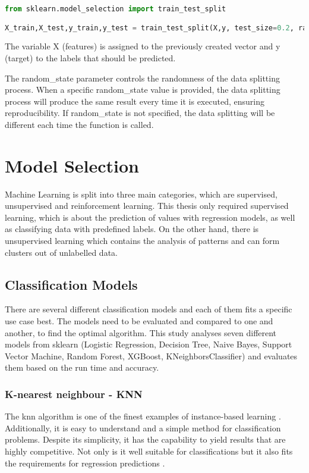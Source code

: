 \begin{lstlisting}[language=Python, caption=Train-Test-Split in Python, label=lst:train-test-split]
from sklearn.model_selection import train_test_split

X_train,X_test,y_train,y_test = train_test_split(X,y, test_size=0.2, random_state=42)
\end{lstlisting}

The variable X (features) is assigned to the previously created vector and y (target) to the labels that should be predicted. 

The random\_state parameter controls the randomness of the data splitting process. When a specific random\_state value is provided, the data splitting process will produce the same result every time it is executed, ensuring reproducibility. If random\_state is not specified, the data splitting will be different each time the function is called.

\section{Model Selection}

Machine Learning is split into three main categories, which are supervised, unsupervised and reinforcement learning. This thesis only required supervised learning, which is about the prediction of values with regression models, as well as classifying data with predefined labels. On the other hand, there is unsupervised learning which contains the analysis of patterns and can form clusters out of unlabelled data.

\subsection{Classification Models}

There are several different classification models and each of them fits a specific use case best. 
The models need to be evaluated and compared to one and another, to find the optimal algorithm. This study analyses seven different models from sklearn (Logistic Regression, Decision Tree, Naive Bayes, Support Vector Machine, Random Forest, XGBoost, KNeighborsClassifier) and evaluates them based on the run time and accuracy. 

\subsubsection{K-nearest neighbour - KNN}
The \ac{knn} algorithm is one of the finest examples of instance-based learning \citep{sen_supervised_2020}. Additionally, it is easy to understand and a simple method for classification problems. Despite its simplicity, it has the capability to yield results that are highly competitive. Not only is it well suitable for classifications but it also fits the requirements for regression predictions \citep{sen_supervised_2020}.

